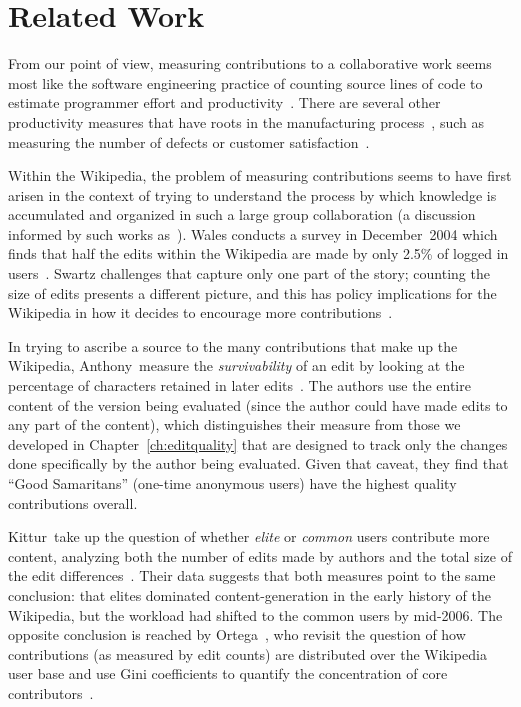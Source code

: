 \section{Related Work}

From our point of view, measuring contributions to a collaborative
work seems most like the software engineering practice of counting
source lines of code to estimate programmer effort and
productivity~\cite{Schultz1988,Park1992}.
There are several other productivity measures that have
roots in the manufacturing process~\cite{Diewart2005},
such as measuring the number of defects or customer
satisfaction~\cite{Tennant2001}.

Within the Wikipedia, the problem of measuring contributions
seems to have first arisen in the context of trying to understand
the process by which knowledge is accumulated and organized
in such a large group collaboration (a discussion informed
by such works
as~\cite{Butler2002,Benkler2002,Surowiecki2004,Reagle2004}).
Wales conducts a survey in December~2004 which finds that half
the edits within the Wikipedia are made by only 2.5\% of logged
in users~\cite{Wales2005}.
Swartz challenges that  capture only one part of the
story; counting the size of edits presents a different picture,
and this has policy implications for the Wikipedia in how
it decides to encourage more contributions~\cite{Swartz2006}.

In trying to ascribe a source to the many contributions
that make up the Wikipedia, Anthony~\etal measure the
\textit{survivability} of an edit by looking at the percentage of
characters retained in later edits~\cite{Anthony2005}.
The authors use the entire content of the version being
evaluated (since the author could have made edits to any
part of the content), which distinguishes their measure
from those we developed in Chapter~\ref{ch:editquality}
that are designed to track only the changes done specifically
by the author being evaluated.
Given that caveat, they find that ``Good Samaritans'' (one-time
anonymous users) have the highest quality contributions overall.

Kittur~\etal take up the question of whether \textit{elite}
or \textit{common} users contribute more content, analyzing both
the number of edits made by authors and the total size of the
edit differences~\cite{Kittur2007}.
Their data suggests that both measures point to the same
conclusion: that elites dominated content-generation in the early
history of the Wikipedia, but the workload had shifted to
the common users by mid-2006.
The opposite conclusion is reached by Ortega~\etal,
who revisit the question of how contributions (as measured by
edit counts) are distributed over the Wikipedia user base and use
Gini coefficients to quantify the concentration of
core contributors~\cite{Ortega2008}.

